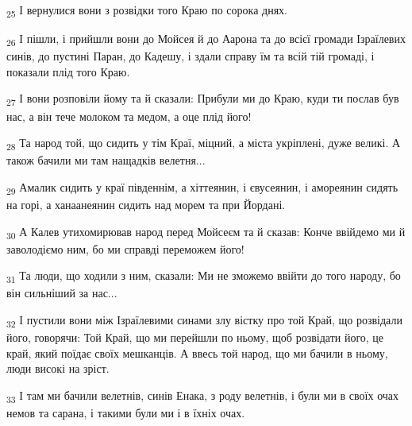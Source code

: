 \begin{tcolorbox}
\textsubscript{25} І вернулися вони з розвідки того Краю по сорока днях.
\end{tcolorbox}
\begin{tcolorbox}
\textsubscript{26} І пішли, і прийшли вони до Мойсея й до Аарона та до всієї громади Ізраїлевих синів, до пустині Паран, до Кадешу, і здали справу їм та всій тій громаді, і показали плід того Краю.
\end{tcolorbox}
\begin{tcolorbox}
\textsubscript{27} І вони розповіли йому та й сказали: Прибули ми до Краю, куди ти послав був нас, а він тече молоком та медом, а оце плід його!
\end{tcolorbox}
\begin{tcolorbox}
\textsubscript{28} Та народ той, що сидить у тім Краї, міцний, а міста укріплені, дуже великі. А також бачили ми там нащадків велетня...
\end{tcolorbox}
\begin{tcolorbox}
\textsubscript{29} Амалик сидить у краї південнім, а хіттеянин, і євусеянин, і амореянин сидять на горі, а ханаанеянин сидить над морем та при Йордані.
\end{tcolorbox}
\begin{tcolorbox}
\textsubscript{30} А Калев утихомирював народ перед Мойсеєм та й сказав: Конче ввійдемо ми й заволодіємо ним, бо ми справді переможем його!
\end{tcolorbox}
\begin{tcolorbox}
\textsubscript{31} Та люди, що ходили з ним, сказали: Ми не зможемо ввійти до того народу, бо він сильніший за нас...
\end{tcolorbox}
\begin{tcolorbox}
\textsubscript{32} І пустили вони між Ізраїлевими синами злу вістку про той Край, що розвідали його, говорячи: Той Край, що ми перейшли по ньому, щоб розвідати його, це край, який поїдає своїх мешканців. А ввесь той народ, що ми бачили в ньому, люди високі на зріст.
\end{tcolorbox}
\begin{tcolorbox}
\textsubscript{33} І там ми бачили велетнів, синів Енака, з роду велетнів, і були ми в своїх очах немов та сарана, і такими були ми і в їхніх очах.
\end{tcolorbox}

